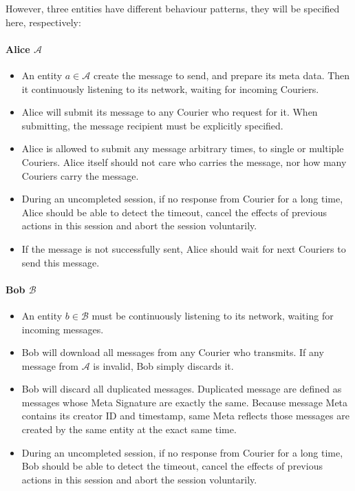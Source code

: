 \documentclass[10pt,a4paper]{article}
\begin{document}
However, three entities have different behaviour patterns, they will be specified here, respectively:
\paragraph{Alice $\mathcal{A}$}
\begin{itemize}
\item An entity $a \in \mathcal{A}$ create the message to send, and prepare its meta data. Then it continuously listening to its network, waiting for incoming Couriers.

\item Alice will submit its message to any Courier who request for it. When submitting, the message recipient must be explicitly specified.

\item Alice is allowed to submit any message arbitrary times, to single or multiple Couriers. Alice itself should not care who carries the message, nor how many Couriers carry the message.

\item During an uncompleted session, if no response from Courier for a long time, Alice should be able to detect the timeout, cancel the effects of previous actions in this session and abort the session voluntarily.

\item If the message is not successfully sent, Alice should wait for next Couriers to send this message.
\end{itemize}

\paragraph{Bob $\mathcal{B}$}
\begin{itemize}
\item An entity $b \in \mathcal{B}$ must be continuously listening to its network, waiting for incoming messages.

\item Bob will download all messages from any Courier who transmits. If any message from $\mathcal{A}$ is invalid, Bob simply discards it.

\item Bob will discard all duplicated messages. Duplicated message are defined as messages whose Meta Signature are exactly the same. Because message Meta contains its creator ID and timestamp, same Meta reflects those messages are created by the same entity at the exact same time.

\item During an uncompleted session, if no response from Courier for a long time, Bob should be able to detect the timeout, cancel the effects of previous actions in this session and abort the session voluntarily.
\end{itemize}
\end{document}
